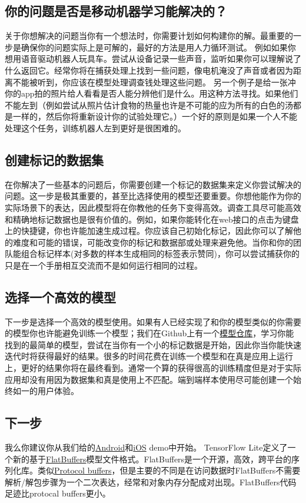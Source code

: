 \subsection{你的问题是否是移动机器学习能解决的？}
关于你想解决的问题当你有一个想法时，你需要计划如何构建你的解。最重要的一步是确保你的问题实际上是可解的，最好的方法是用人力循环测试。
例如如果你想用语音驱动机器人玩具车。尝试从设备记录一些声音，监听如果你可以理解说了什么返回它。经常你将在捕获处理上找到一些问题，像电机淹没了声音或者因为距离不能被听到，你应该在模型处理调查钱处理这些问题。
另一个例子是给一张冲你的app拍的照片给人看看是否人能分辨他们是什么。用这种方法寻找。如果他们不能左到（例如尝试从照片估计食物的热量也许是不可能的应为所有的白色的汤都是一样的，然后你将重新设计你的试验处理它。）一个好的原则是如果一个人不能处理这个任务，训练机器人左到更好是很困难的。
\subsection{创建标记的数据集}
在你解决了一些基本的问题后，你需要创建一个标记的数据集来定义你尝试解决的问题。这一步是极其重要的，甚至比选择使用的模型还要重要。你想他能作为你的实际场景下的表达，因此模型将在你教他的任务下变得高效。调查工具尽可能高效和精确地标记数据也是很有价值的。例如，如果你能转化在web接口的点击为键盘上的快捷键，你也许能加速生成过程。你应该自己初始化标记，因此你可以了解他的难度和可能的错误，可能改变你的标记和数据部或处理来避免他。当你和你的团队能组合标记样本(对多数的样本生成相同的标签表示赞同)，你可以尝试捕获你的只是在一个手册相互交流而不是如何运行相同的过程。
\subsection{选择一个高效的模型}
下一步是选择一个高效的模型使用。如果有人已经实现了和你的模型类似的你需要的模型你也许能避免训练一个模型；我们在Github上有一个\href{https://github.com/tensorflow/models}{模型仓库}，学习你能找到的最简单的模型，尝试在当你有一个小的标记数据是开始，因此你当你能快速迭代时将获得最好的结果。很多的时间花费在训练一个模型和在真是应用上运行上，更好的结果你将在最终看到。通常一个算的获得很高的训练精度但是对于实际应用却没有用因为数据集和真是使用上不匹配。端到端样本使用尽可能创建一个始终如一的用户体验。
\subsection{下一步}
我么你建议你从我们给的\href{https://www.tensorflow.org/mobile/android_build?hl=zh-cn}{Android}和\href{https://www.tensorflow.org/mobile/ios_build?hl=zh-cn}{iOS} demo中开始。
TensorFlow Lite定义了一个新的基于\href{https://google.github.io/flatbuffers/}{FlatBuffers}模型文件格式。FlatBuffers是一个开源，高效，跨平台的序列化库。类似\href{https://developers.google.com/protocol-buffers/?hl=en}{Protocol buffers}，但是主要的不同是在访问数据时FlatBuffers不需要解析/解包步骤为一个二次表达，经常和对象内存分配成对出现。FlatBuffers代码足迹比protocal buffers更小。


